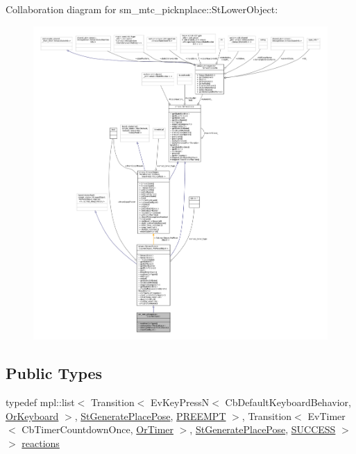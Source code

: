 Collaboration diagram for sm\+\_\+mtc\+\_\+picknplace\+:\+:St\+Lower\+Object\+:
\nopagebreak
\begin{figure}[H]
\begin{center}
\leavevmode
\includegraphics[width=350pt]{structsm__mtc__picknplace_1_1StLowerObject__coll__graph}
\end{center}
\end{figure}
\subsection*{Public Types}
\begin{DoxyCompactItemize}
\item 
typedef mpl\+::list$<$ Transition$<$ Ev\+Key\+PressN$<$ Cb\+Default\+Keyboard\+Behavior, \hyperlink{classsm__mtc__picknplace_1_1OrKeyboard}{Or\+Keyboard} $>$, \hyperlink{structsm__mtc__picknplace_1_1StGeneratePlacePose}{St\+Generate\+Place\+Pose}, \hyperlink{classPREEMPT}{P\+R\+E\+E\+M\+PT} $>$, Transition$<$ Ev\+Timer$<$ Cb\+Timer\+Countdown\+Once, \hyperlink{classsm__mtc__picknplace_1_1OrTimer}{Or\+Timer} $>$, \hyperlink{structsm__mtc__picknplace_1_1StGeneratePlacePose}{St\+Generate\+Place\+Pose}, \hyperlink{classSUCCESS}{S\+U\+C\+C\+E\+SS} $>$ $>$ \hyperlink{structsm__mtc__picknplace_1_1StLowerObject_a158ee42367d7deba1d15ff719eb3d0d2}{reactions}
\end{DoxyCompactItemize}
